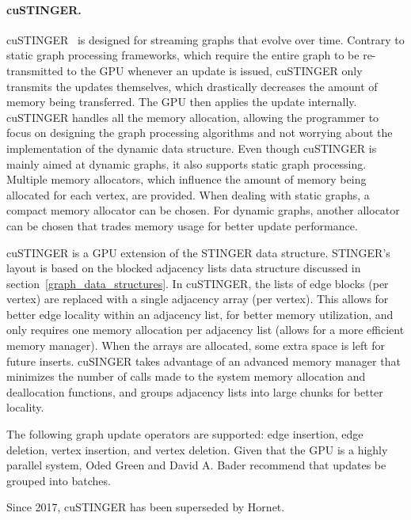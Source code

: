 
    \paragraph{\textbf{cuSTINGER}.}
    cuSTINGER~\cite{paper:custinger} is designed for streaming graphs that evolve over time. Contrary to static graph processing frameworks, which require the entire graph to be re-transmitted to the \gls{GPU} whenever an update is issued, cuSTINGER only transmits the updates themselves, which drastically decreases the amount of memory being transferred. The \gls{GPU} then applies the update internally. cuSTINGER handles all the memory allocation, allowing the programmer to focus on designing the graph processing algorithms and not worrying about the implementation of the dynamic data structure. Even though cuSTINGER is mainly aimed at dynamic graphs, it also supports static graph processing. Multiple memory allocators, which influence the amount of memory being allocated for each vertex, are provided. When dealing with static graphs, a compact memory allocator can be chosen. For dynamic graphs, another allocator can be chosen that trades memory usage for better update performance.
    
    cuSTINGER is a \gls{GPU} extension of the \gls{STINGER} data structure. \gls{STINGER}'s layout is based on the blocked adjacency lists data structure discussed in section~\ref{graph_data_structures}.
    In cuSTINGER, the lists of edge blocks (per vertex) are replaced with a single adjacency array (per vertex). This allows for better edge locality within an adjacency list, for better memory utilization, and only requires one memory allocation per adjacency list (allows for a more efficient memory manager). When the arrays are allocated, some extra space is left for future inserts. cuSINGER takes advantage of an advanced memory manager that minimizes the number of calls made to the system memory allocation and deallocation functions, and groups adjacency lists into large chunks for better locality.
    
    The following graph update operators are supported: edge insertion, edge deletion, vertex insertion, and vertex deletion. Given that the \gls{GPU} is a highly parallel system, Oded Green and David A. Bader recommend that updates be grouped into batches.

    Since 2017, cuSTINGER has been superseded by Hornet.

